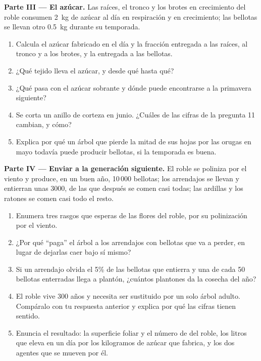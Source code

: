 \begin{problem}
\medskip
\noindent\textbf{Parte III --- El azúcar.}
Las raíces, el tronco y los brotes en crecimiento del roble consumen
\qty{2}{kg} de azúcar al día en respiración y en crecimiento; las
bellotas se llevan otro \qty{0.5}{kg} durante su temporada.
\begin{enumerate}[resume]
  \item Calcula el azúcar fabricado en el día y la fracción entregada a
        las raíces, al tronco y a los brotes, y la entregada a las
        bellotas.
  \item ¿Qué tejido lleva el azúcar, y desde qué hasta qué?
  \item ¿Qué pasa con el azúcar sobrante y dónde puede encontrarse a la
        primavera siguiente?
  \item Se corta un anillo de corteza en junio. ¿Cuáles de las cifras
        de la pregunta 11 cambian, y cómo?
  \item Explica por qué un árbol que pierde la mitad de sus hojas por
        las orugas en mayo todavía puede producir bellotas, si la
        temporada es buena.
\end{enumerate}

\medskip
\noindent\textbf{Parte IV --- Enviar a la generación siguiente.}
El roble se poliniza por el viento y produce, en un buen año, 10\,000
bellotas; los arrendajos se llevan y entierran unas 3000, de las que
después se comen casi todas; las ardillas y los ratones se comen casi
todo el resto.
\begin{enumerate}[resume]
  \item Enumera tres rasgos que esperas de las flores del roble, por su
        polinización por el viento.
  \item ¿Por qué ``paga'' el árbol a los arrendajos con bellotas que va
        a perder, en lugar de dejarlas caer bajo sí mismo?
  \item Si un arrendajo olvida el 5\% de las bellotas que entierra y una
        de cada 50 bellotas enterradas llega a plantón, ¿cuántos
        plantones da la cosecha del año?
  \item El roble vive 300 años y necesita ser sustituido por un solo
        árbol adulto. Compáralo con tu respuesta anterior y explica por
        qué las cifras tienen sentido.
  \item Enuncia el resultado: la superficie foliar y el número de
         del roble, los litros que eleva en un día por los
        kilogramos de azúcar que fabrica, y los dos agentes que se
        mueven por él.
\end{enumerate}
\end{problem}
